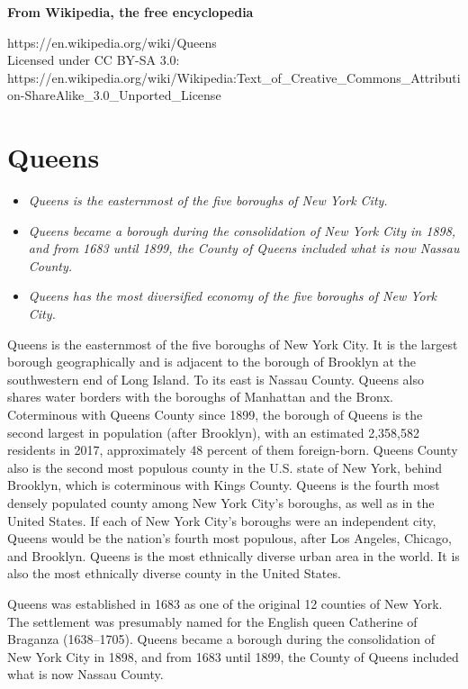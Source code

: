 \textbf{From Wikipedia, the free encyclopedia}

https://en.wikipedia.org/wiki/Queens\\
Licensed under CC BY-SA 3.0:\\
https://en.wikipedia.org/wiki/Wikipedia:Text\_of\_Creative\_Commons\_Attribution-ShareAlike\_3.0\_Unported\_License

\section{Queens}\label{queens}

\begin{itemize}
\item
  \emph{Queens is the easternmost of the five boroughs of New York
  City.}
\item
  \emph{Queens became a borough during the consolidation of New York
  City in 1898, and from 1683 until 1899, the County of Queens included
  what is now Nassau County.}
\item
  \emph{Queens has the most diversified economy of the five boroughs of
  New York City.}
\end{itemize}

Queens is the easternmost of the five boroughs of New York City. It is
the largest borough geographically and is adjacent to the borough of
Brooklyn at the southwestern end of Long Island. To its east is Nassau
County. Queens also shares water borders with the boroughs of Manhattan
and the Bronx. Coterminous with Queens County since 1899, the borough of
Queens is the second largest in population (after Brooklyn), with an
estimated 2,358,582 residents in 2017, approximately 48 percent of them
foreign-born. Queens County also is the second most populous county in
the U.S. state of New York, behind Brooklyn, which is coterminous with
Kings County. Queens is the fourth most densely populated county among
New York City's boroughs, as well as in the United States. If each of
New York City's boroughs were an independent city, Queens would be the
nation's fourth most populous, after Los Angeles, Chicago, and Brooklyn.
Queens is the most ethnically diverse urban area in the world. It is
also the most ethnically diverse county in the United States.

Queens was established in 1683 as one of the original 12 counties of New
York. The settlement was presumably named for the English queen
Catherine of Braganza (1638--1705). Queens became a borough during the
consolidation of New York City in 1898, and from 1683 until 1899, the
County of Queens included what is now Nassau County.

